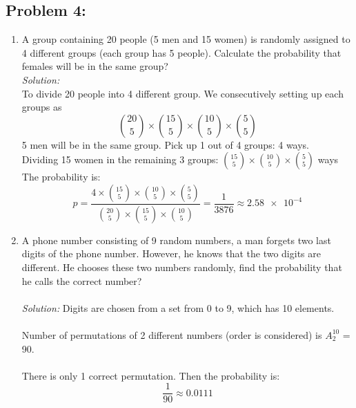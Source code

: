 \documentclass[a4paper]{article}
\begin{document}
	\subsection*{Problem 4:}
	\begin{enumerate}
		\item A group containing 20 people (5 men and 15 women) is randomly assigned to 4 different groups (each group has 5 people). Calculate the probability that females will be in the same group? \\
		\textit{Solution:}\\
		To divide 20 people into 4 different group. We consecutively setting up each groups as
		\begin{equation*} 
		    {20 \choose 5} \times {15 \choose 5} \times {10 \choose 5} \times {5 \choose 5}
		\end{equation*}
		5 men will be in the same group. Pick up 1 out of 4 groups: 4 ways. \\
		Dividing 15 women in the remaining 3 groups: ${15 \choose 5} \times {10 \choose 5} \times {5 \choose 5}$ ways \\
		The probability is: 
		\begin{equation*}
		    p = \frac{4 \times {15 \choose 5} \times {10 \choose 5} \times {5 \choose 5}}{{20 \choose 5} \times {15 \choose 5} \times {10 \choose 5}}  = \frac{1}{3876} \approx \num{2.58e-4}
		\end{equation*}
		\item A phone number consisting of 9 random numbers, a man forgets two last digits of the phone number. However, he knows that the two digits are different. He chooses these two numbers randomly, find the probability that he calls the correct number?\\\\
		\textit{Solution:}
		Digits are chosen from a set from 0 to 9, which has 10 elements.\\\\
		Number of permutations of 2 different numbers (order is considered) is $A_{2}^{10}$ = 90.\\\\
		There is only 1 correct permutation. Then the probability is:
		\begin{equation*}
		    \frac{1}{90} \approx 0.0111 
		\end{equation*}
		

\end{enumerate}
\end{document}
